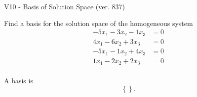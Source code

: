 \begin{exercise}
  \begin{exerciseTitle}V10 - Basis of Solution Space (ver. 837)\end{exerciseTitle}
  \begin{exerciseStatement}
    Find a basis for the solution space of the homogeneous system 
\begin{align*}
 -5 x_ 1 -3 x_ 2 -1 x_ 3 &= 0  \\ 
  4 x_ 1 -6 x_ 2 + 3 x_ 3 &= 0  \\ 
  -5 x_ 1 -1 x_ 2 + 4 x_ 3 &= 0  \\ 
  1 x_ 1 -2 x_ 2 + 2 x_ 3 &= 0  \\ 
 \end{align*}


 
  \end{exerciseStatement}

  \begin{exerciseAnswer}
   A basis is   
\[\left\{\right\}.\]

  


  \end{exerciseAnswer}
\end{exercise}